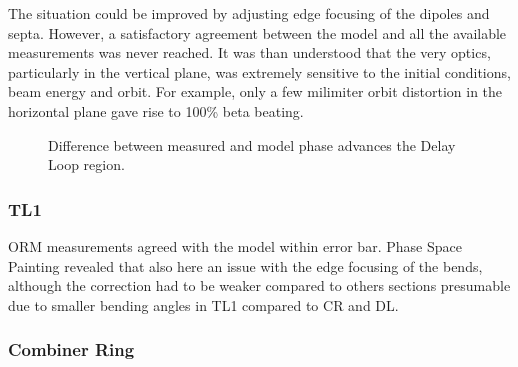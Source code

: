 The situation could be improved by adjusting edge focusing of the dipoles and septa.
However, a satisfactory agreement between the model and 
all the available measurements was never reached. 
It was than understood that the very optics, 
particularly in the vertical plane, was extremely sensitive to the initial conditions,
beam energy and orbit. For example, only a few milimiter orbit distortion 
in the horizontal plane gave rise to 100\% beta beating. 

\begin{figure}
 \begin{center}
 \caption{Difference between measured and model phase advances the Delay Loop region.}
  \label{fig:0302_PhSpPaint_DLini}

 \end{center}
\end{figure}


\subsubsection{TL1}

ORM measurements agreed with the model within error bar.
Phase Space Painting revealed that also here an issue with the edge focusing 
of the bends, although the correction had to be weaker compared to others sections 
presumable due to smaller bending angles in TL1 compared to CR and DL.


\subsubsection{Combiner Ring}


